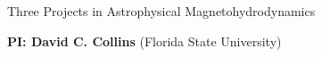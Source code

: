 \documentclass[11pt]{NSF}  %
\begin{document}
\begin{centering}
\begin{LARGE}
    Three Projects in Astrophysical Magnetohydrodynamics
\end{LARGE}


\vspace{2mm}
{\bf PI: David C. Collins} (Florida State University)

\end{centering}
\pagestyle{plain}

%
%
%

\end{document}
